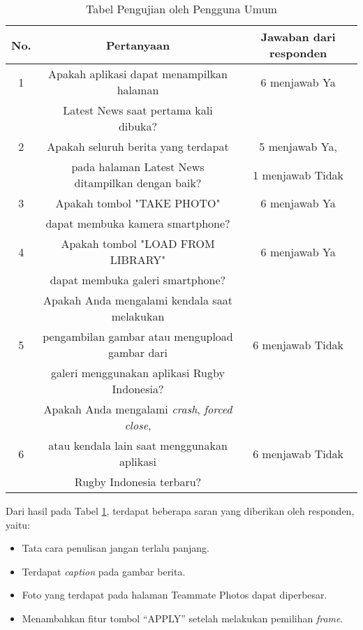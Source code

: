 \begin{table} [H]
    \centering
    \caption{Tabel Pengujian oleh Pengguna Umum}
    \begin{tabular}{|c|c|c|}
    \hline
       No. & Pertanyaan & Jawaban dari responden  \\ \hline
       1 & Apakah aplikasi dapat menampilkan halaman & 6 menjawab Ya \\ 
        & Latest News saat pertama kali dibuka? &  \\ \hline
    2 & Apakah seluruh berita yang terdapat & 5 menjawab Ya, \\
       &  pada halaman Latest News ditampilkan dengan baik? & 1 menjawab Tidak \\ \hline
       3 & Apakah tombol "TAKE PHOTO" & 6 menjawab Ya \\
     & dapat membuka kamera smartphone? & \\ \hline
     4 & Apakah tombol "LOAD FROM LIBRARY" & 6 menjawab Ya \\
     & dapat membuka galeri smartphone? & \\ \hline
     & Apakah Anda mengalami kendala saat melakukan & \\
      5 & pengambilan gambar atau mengupload gambar dari & 6 menjawab Tidak \\
     & galeri menggunakan aplikasi Rugby Indonesia? & \\ \hline
     & Apakah Anda mengalami \textit{crash}, \textit{forced close},  & \\
     6 & atau kendala lain saat menggunakan aplikasi & 6 menjawab Tidak \\
     & Rugby Indonesia terbaru? & \\ \hline
    \end{tabular}
    \label{tab:user-acceptance-test}
\end{table}

Dari hasil pada Tabel \ref{tab:user-acceptance-test}, terdapat beberapa saran yang diberikan oleh responden, yaitu:
\begin{itemize}
    \item Tata cara penulisan jangan terlalu panjang.
    \item Terdapat \textit{caption} pada gambar berita.
    \item Foto yang terdapat pada halaman Teammate Photos dapat diperbesar.
    \item Menambahkan fitur tombol ``APPLY'' setelah melakukan pemilihan \textit{frame}.
\end{itemize}